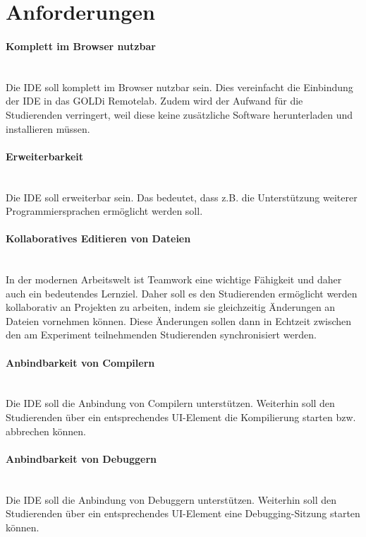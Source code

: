 \section{Anforderungen} \label{anforderungen}

\paragraph{Komplett im Browser nutzbar} \mbox{} \\
Die IDE soll komplett im Browser nutzbar sein. Dies vereinfacht die Einbindung der IDE in das GOLDi Remotelab. Zudem wird der Aufwand für die Studierenden verringert, weil diese keine zusätzliche Software herunterladen und installieren müssen.

\paragraph{Erweiterbarkeit} \mbox{} \\
Die IDE soll erweiterbar sein. Das bedeutet, dass z.B. die Unterstützung weiterer Programmiersprachen ermöglicht werden soll.

\paragraph{Kollaboratives Editieren von Dateien} \mbox{} \\
In der modernen Arbeitswelt ist Teamwork eine wichtige Fähigkeit und daher auch ein bedeutendes Lernziel. Daher soll es den Studierenden ermöglicht werden kollaborativ an Projekten zu arbeiten, indem sie gleichzeitig Änderungen an Dateien vornehmen können. Diese Änderungen sollen dann in Echtzeit zwischen den am Experiment teilnehmenden Studierenden synchronisiert werden.

\paragraph{Anbindbarkeit von Compilern} \mbox{} \\
Die IDE soll die Anbindung von Compilern unterstützen. Weiterhin soll den Studierenden über ein entsprechendes UI-Element die Kompilierung starten bzw. abbrechen können.

\paragraph{Anbindbarkeit von Debuggern} \mbox{} \\
Die IDE soll die Anbindung von Debuggern unterstützen. Weiterhin soll den Studierenden über ein entsprechendes UI-Element eine Debugging-Sitzung starten können. 

